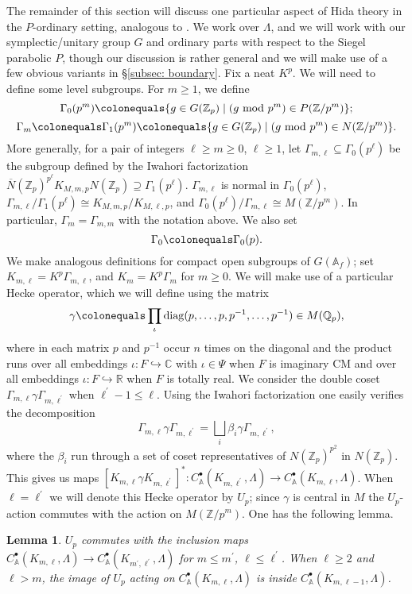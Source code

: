 \documentclass{amsart}
\newtheorem{lemma}[subsubsection]{Lemma}
\theoremstyle{remark}
\numberwithin{equation}{subsection}
\newcommand{\A}{\AA}
\def\C{\CC}
\newcommand{\Q}{\QQ}
\newcommand{\R}{\RR}
\newcommand{\Z}{\ZZ}
\renewcommand{\AA}{{\mathbb A}}
\newcommand{\CC}{{\mathbb C}}
\newcommand{\QQ}{{\mathbb Q}}
\newcommand{\RR}{{\mathbb R}}
\newcommand{\ZZ}{{\mathbb Z}}
\newcommand{\Zp}{\Z_p}
\newcommand{\ol}{\overline}
\newcommand{\sub}{\subseteq}
\newcommand{\defeq}{\colonequals}
\renewcommand{\(}{\left(}
\renewcommand{\)}{\right)}
\begin{document}
The remainder of this section will discuss one particular aspect of Hida theory in the $P$-ordinary setting, analogous to \cite[Lemma 6.10]{khare-thorne}. We work over $\Lambda$, and we will work with our symplectic/unitary group $G$ and ordinary parts with respect to the Siegel parabolic $P$, though our discussion is rather general and we will make use of a few obvious variants in \S \ref{subsec: boundary}. Fix a neat $K^p$. We will need to define some level subgroups. For $m\geq 1$, we define
\[
\Gamma_0(p^m) \defeq \{ g\in G(\Zp) \mid (g\,\, \mathrm{mod} \,\, p^m) \in P(\Z/p^m) \};
\]
\[
\Gamma_m \defeq \Gamma_1(p^m) \defeq \{ g\in G(\Zp) \mid (g\,\, \mathrm{mod} \,\, p^m) \in N(\Z/p^m) \}.
\]
More generally, for a pair of integers $\ell\geq m \geq 0$, $\ell\geq 1$, let $\Gamma_{m,\ell} \sub \Gamma_0(p^\ell)$ be the subgroup defined by the Iwahori factorization $\ol{N}(\Zp)^{p^\ell}K_{M,m,p}N(\Zp) \supseteq \Gamma_1(p^\ell)$. $\Gamma_{m,\ell}$ is normal in $\Gamma_0(p^\ell)$, $\Gamma_{m,\ell} / \Gamma_1(p^\ell) \cong K_{M,m,p}/K_{M,\ell,p}$, and $\Gamma_0(p^\ell)/\Gamma_{m,\ell} \cong M(\Z/p^m)$. In particular, $\Gamma_m = \Gamma_{m,m}$ with the notation above. We also set
\[
\Gamma_0 \defeq \Gamma_0(p).
\]
We make analogous definitions for compact open subgroups of $G(\A_f)$; set $K_{m,\ell}=K^p\Gamma_{m,\ell}$, and $K_m = K^p \Gamma_m$ for $m\geq 0$. We will make use of a particular Hecke operator, which we will define using the matrix
\[
\gamma \defeq \prod_{\iota} \mathrm{diag}(p,\dots,p,p^{-1},\dots,p^{-1})\in M(\Q_p),
\]
where in each matrix $p$ and $p^{-1}$ occur $n$ times on the diagonal and the product runs over all embeddings $\iota \colon F\hookrightarrow \C$ with $\iota\in \Psi$ when $F$ is imaginary CM and over all embeddings $\iota \colon F\hookrightarrow \R$ when $F$ is totally real. We consider the double coset $\Gamma_{m,\ell}\gamma \Gamma_{m,\ell^\prime}$ when $\ell^\prime -1 \leq \ell$. Using the Iwahori factorization one easily verifies the decomposition
\[
\Gamma_{m,\ell}\gamma \Gamma_{m,\ell^\prime} = \bigsqcup_i \beta_i \gamma \Gamma_{m,\ell^\prime},
\]
where the $\beta_i$ run through a set of coset representatives of $N(\Zp)^{p^2}$ in $N(\Zp)$. This gives us maps $[K_{m,\ell}\gamma K_{m,\ell^\prime}]^\ast : C_\A^\bullet(K_{m,\ell^\prime},\Lambda) \to C_\A^\bullet(K_{m,\ell},\Lambda)$. When $\ell=\ell^\prime$ we will denote this Hecke operator by $U_p$; since $\gamma$ is central in $M$ the $U_p$-action commutes with the action on $M(\Z/p^m)$. One has the following lemma.

\begin{lemma}\label{hida contraction}
$U_p$ commutes with the inclusion maps $C^\bullet_\A(K_{m,\ell},\Lambda) \to C_\A^\bullet(K_{m^\prime,\ell^\prime},\Lambda)$ for $m\leq m^\prime$, $\ell \leq \ell^\prime$. When $\ell\geq 2$ and $\ell>m$, the image of $U_p$ acting on $C_\A^\bullet(K_{m,\ell},\Lambda)$ is inside $C_\A^\bullet(K_{m,\ell-1},\Lambda)$.
\end{lemma}
\end{document}
